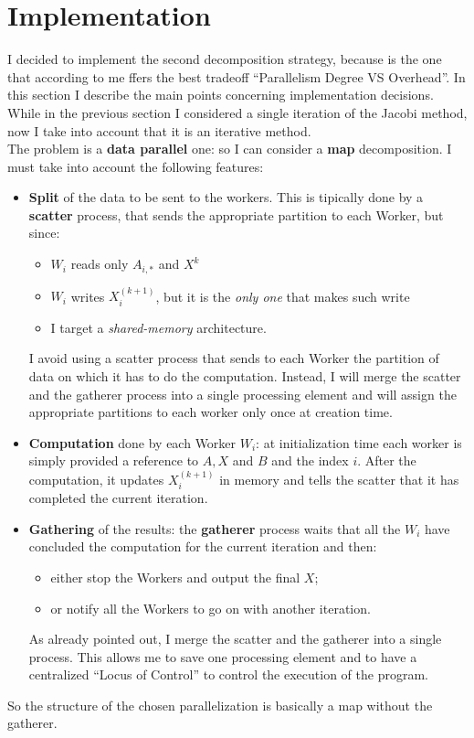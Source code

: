 \documentclass{article}
\begin{document}
\section{Implementation} I decided to implement the second decomposition strategy, because is the one that according to me ffers the best tradeoff ``Parallelism Degree VS Overhead''. In this section I describe the main points concerning implementation decisions. While in the previous section I considered a single iteration of the Jacobi method, now I take into account that it is an iterative method. \\
The problem is a \textbf{data parallel} one: so I can consider a \textbf{map} decomposition. I must take into account the following features:
\begin{itemize}
\item \textbf{Split} of the data to be sent to the workers. This is tipically done by a \textbf{scatter} process, that sends the appropriate partition to each Worker, but since:
	\begin{itemize}
	\item $W_{i}$ reads only $A_{i,*}$ and $X^{k}$ 
	\item $W_{i}$ writes $X_{i}^{(k+1)}$, but it is the \textit{only one} that makes such write
	\item I target a \textit{shared-memory} architecture.
	\end{itemize}
I avoid using a scatter process that sends to each Worker the partition of data on which it has to do the computation. Instead, I will merge the scatter and the gatherer process into a single processing element and will assign the appropriate partitions to each worker only once at creation time.
\item \textbf{Computation} done by each Worker $W_{i}$: at initialization time each worker is simply provided a reference to $A, X$ and $B$ and the index $i$. After the computation, it updates $X_{i}^{(k+1)}$ in memory and tells the scatter that it has completed the current iteration.
\item \textbf{Gathering} of the results: the \textbf{gatherer} process waits that all the $W_{i}$ have concluded the computation for the current iteration and then:
	\begin{itemize}
	\item either stop the Workers and output the final $X$;
	\item or notify all the Workers to go on with another iteration.
	\end{itemize}
As already pointed out, I merge the scatter and the gatherer into a single process. This allows me to save one processing element and to have a centralized ``Locus of Control'' to control the execution of the program. \\
\end{itemize}
So the structure of the chosen parallelization is basically a map without the gatherer.
\end{document}
